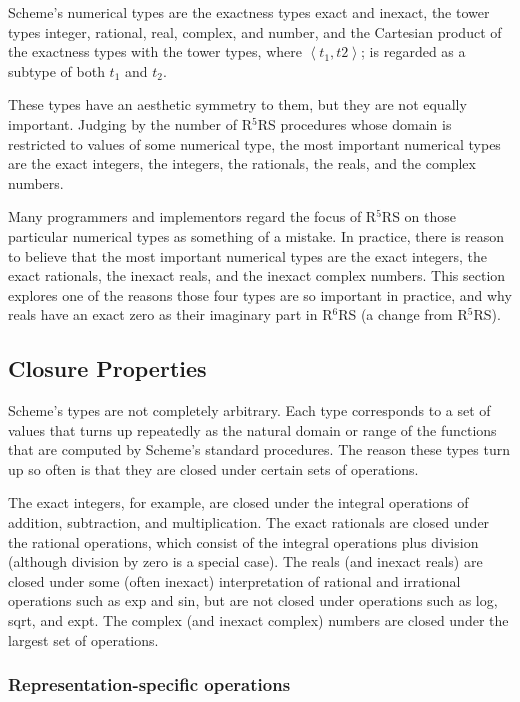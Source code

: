\documentclass[twoside,twocolumn]{algol60}
\newcommand{\rn}[1]{R$^{#1}$RS}
\begin{document}
Scheme's numerical types are the exactness types exact and inexact,
the tower types integer, rational, real, complex, and number, and the
Cartesian product of the exactness types with the tower types, where
$\left< t_1, t2 \right>$; is regarded as a subtype of both $t_1$ and
$t_2$.

These types have an aesthetic symmetry to them, but they are not
equally important.  Judging by the number of \rn{5} procedures whose
domain is restricted to values of some numerical type, the most
important numerical types are the exact integers, the integers, the
rationals, the reals, and the complex numbers.

Many programmers and implementors regard the focus of \rn{5} on those
particular numerical types as something of a mistake.  In practice,
there is reason to believe that the most important numerical types are
the exact integers, the exact rationals, the inexact reals, and the
inexact complex numbers.  This section explores one of the reasons
those four types are so important in practice, and why reals have an
exact zero as their imaginary part in \rn{6} (a change from \rn{5}).

\subsection{Closure Properties}
\label{closurepropertiessection}

Scheme's types are not completely arbitrary.  Each type corresponds to
a set of values that turns up repeatedly as the natural domain or
range of the functions that are computed by Scheme's standard
procedures.  The reason these types turn up so often is that they are
closed under certain sets of operations.

The exact integers, for example, are closed under the integral
operations of addition, subtraction, and multiplication.  The exact
rationals are closed under the rational operations, which consist of
the integral operations plus division (although division by zero is a special
case).  The reals (and inexact reals) are closed
under some (often inexact) interpretation of rational and irrational
operations such as exp and sin, but are not closed under operations
such as {\cf log}, {\cf sqrt}, and {\cf expt}.  The complex (and
inexact complex) numbers are closed under the largest set of
operations.

\subsubsection{Representation-specific operations}
\end{document}
